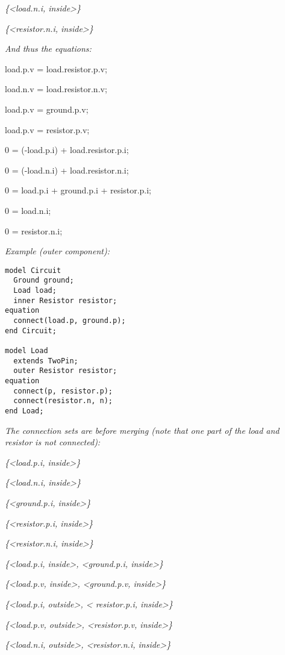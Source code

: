 \emph{\{\textless{}load.n.i, inside\textgreater{}\}}

\emph{\{\textless{}resistor.n.i, inside\textgreater{}\}}

\emph{And thus the equations:}

load.p.v = load.resistor.p.v;

load.n.v = load.resistor.n.v;

load.p.v = ground.p.v;

load.p.v = resistor.p.v;

0 = (-load.p.i) + load.resistor.p.i;

0 = (-load.n.i) + load.resistor.n.i;

0 = load.p.i + ground.p.i + resistor.p.i;

0 = load.n.i;

0 = resistor.n.i;

\emph{Example (outer component):}

\begin{lstlisting}[language=modelica]
model Circuit
  Ground ground;
  Load load;
  inner Resistor resistor;
equation
  connect(load.p, ground.p);
end Circuit;

model Load
  extends TwoPin;
  outer Resistor resistor;
equation
  connect(p, resistor.p);
  connect(resistor.n, n);
end Load;
\end{lstlisting}
\emph{The connection sets are before merging (note that one part of the
load and resistor is not connected):}

\emph{\{\textless{}load.p.i, inside\textgreater{}\}}

\emph{\{\textless{}load.n.i, inside\textgreater{}\}}

\emph{\{\textless{}ground.p.i, inside\textgreater{}\}}

\emph{\{\textless{}resistor.p.i, inside\textgreater{}\}}

\emph{\{\textless{}resistor.n.i, inside\textgreater{}\}}

\emph{\{\textless{}load.p.i, inside\textgreater{},
\textless{}ground.p.i, inside\textgreater{}\}}

\emph{\{\textless{}load.p.v, inside\textgreater{},
\textless{}ground.p.v, inside\textgreater{}\}}

\emph{\{\textless{}load.p.i, outside\textgreater{}, \textless{}
resistor.p.i, inside\textgreater{}\}}

\emph{\{\textless{}load.p.v, outside\textgreater{},
\textless{}resistor.p.v, inside\textgreater{}\}}

\emph{\{\textless{}load.n.i, outside\textgreater{},
\textless{}resistor.n.i, inside\textgreater{}\}}

